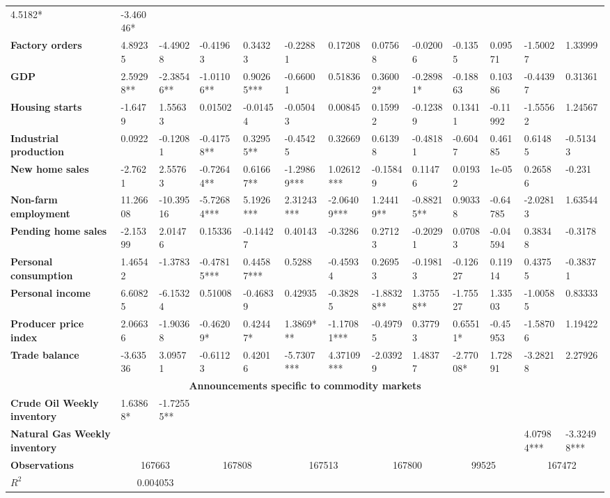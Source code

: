 \begin{sidewaystable}
{\begin{tabular}{@{}lllllllllllll@{}}
4.5182* & -3.46046* \\ \textbf{Factory orders}& 4.89235 & -4.49028 & -0.41963 & 0.34323 & -0.22881 & 0.17208 & 0.07568 & -0.02006 & -0.1355 & 0.09571 & -1.50027 & 1.33999 \\ \textbf{GDP}& 2.59298**& -2.38546**& -1.01106**& 0.90265***& -0.66001 & 0.51836 & 0.36002* & -0.28981* & -0.18863 & 0.10386 & -0.44397 & 0.31361 \\ \textbf{Housing starts}& -1.6479 & 1.55633 & 0.01502 & -0.01454 & -0.05043 & 0.00845 & 0.15992 & -0.12389 & 0.13411 & -0.11992 & -1.55562 & 1.24567 \\ \textbf{Industrial production}& 0.0922 & -0.12081 & -0.41758** & 0.32955** & -0.45425 & 0.32669 & 0.61398 & -0.48181 & -0.6047 & 0.46185 & 0.61485 & -0.51343 \\ \textbf{New home sales}& -2.7621 & 2.55763 & -0.72644** & 0.61667** & -1.29869*** & 1.02612*** & -0.15849 & 0.11476 & 0.01932 & 1e-05 & 0.26586 & -0.231 \\ \textbf{Non-farm employment}& 11.26608 & -10.39516 & -5.72684***& 5.1926***& 2.31243*** & -2.06409*** & 1.24419** & -0.88215** & 0.90338 & -0.64785 & -2.02813 & 1.63544 \\ \textbf{Pending home sales}& -2.15399 & 2.01476 & 0.15336 & -0.14427 & 0.40143 & -0.3286 & 0.27123 & -0.20291 & 0.07083 & -0.04594 & 0.38348 & -0.3178 \\ \textbf{Personal consumption}& 1.46542 & -1.3783 & -0.47815***& 0.44587***& 0.5288 & -0.45934 & 0.26953 & -0.19813 & -0.12627 & 0.11914 & 0.43755 & -0.38371 \\ \textbf{Personal income}& 6.60825 & -6.15324 & 0.51008 & -0.46839 & 0.42935 & -0.38285 & -1.88328** & 1.37558** & -1.75527 & 1.33503 & -1.00585 & 0.83333 \\ \textbf{Producer price index}& 2.06636 & -1.90368 & -0.46209*& 0.42447*& 1.3869*** & -1.17081*** & -0.49795 & 0.37793 & 0.65511* & -0.45953 & -1.58706 & 1.19422 \\ \textbf{Trade balance}& -3.63536 & 3.09571 & -0.61123 & 0.42016 & -5.7307*** & 4.37109*** & -2.03929 & 1.48377 & -2.77008* & 1.72891 & -3.28218 & 2.27926 \\  \midrule \multicolumn{13}{c}{\textbf{Announcements specific to commodity markets}} \\ \midrule \textbf{Crude Oil Weekly inventory}& 1.63868* & -1.72555** &  &  &  &  &  &  &  &  &  &  \\ \textbf{Natural Gas Weekly inventory}&  &  &  &  &  &  &  &  &  &  & 4.07984*** & -3.32498*** \\  \midrule \textbf{Observations}             &\multicolumn{2}{c}{ 167663 }                                                 & \multicolumn{2}{c}{ 167808 }                                                 & \multicolumn{2}{c}{ 167513 }                                                 & \multicolumn{2}{c}{ 167800 }                                                 & \multicolumn{2}{c}{ 99525 }                                                   & \multicolumn{2}{c}{ 167472 }                                                 \\ \textbf{$R^2$}             &\multicolumn{2}{c}{ 0.004053 }          
\end{tabular}}
\end{sidewaystable}

